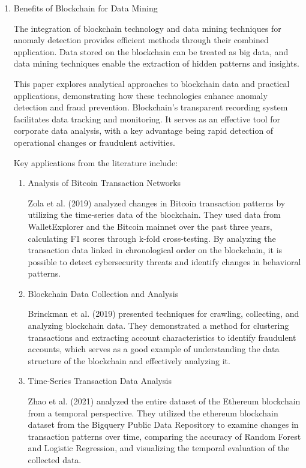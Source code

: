 \documentclass[conference]{IEEEtran}
\begin{document}
	\begin{enumerate}[itemsep=2ex, parsep=1ex]
		\item Benefits of Blockchain for Data Mining

			The integration of blockchain technology and data mining techniques for anomaly detection provides efficient methods through their combined application. Data stored on the blockchain can be treated as big data, and data mining techniques enable the extraction of hidden patterns and insights.

            This paper explores analytical approaches to blockchain data and practical applications, demonstrating how these technologies enhance anomaly detection and fraud prevention. Blockchain's transparent recording system facilitates data tracking and monitoring. It serves as an effective tool for corporate data analysis, with a key advantage being rapid detection of operational changes or fraudulent activities.

			Key applications from the literature include:

			\begin{enumerate}[itemsep=2ex, parsep=1ex]
				\item Analysis of Bitcoin Transaction Networks

					Zola et al. (2019) analyzed changes in Bitcoin transaction patterns by utilizing the time-series data of the blockchain. They used data from WalletExplorer and the Bitcoin mainnet over the past three years, calculating F1 scores through k-fold cross-testing. By analyzing the transaction data linked in chronological order on the blockchain, it is possible to detect cybersecurity threats and identify changes in behavioral patterns.

				\item Blockchain Data Collection and Analysis

					Brinckman et al. (2019) presented techniques for crawling, collecting, and analyzing blockchain data. They demonstrated a method for clustering transactions and extracting account characteristics to identify fraudulent accounts, which serves as a good example of understanding the data structure of the blockchain and effectively analyzing it.

				\item Time-Series Transaction Data Analysis

					Zhao et al. (2021) analyzed the entire dataset of the Ethereum blockchain from a temporal perspective. They utilized the ethereum blockchain dataset from the Bigquery Public Data Repository to examine changes in transaction patterns over time, comparing the accuracy of Random Forest and Logistic Regression, and visualizing the temporal evaluation of the collected data.
			\end{enumerate}


\end{enumerate}
\end{document}

